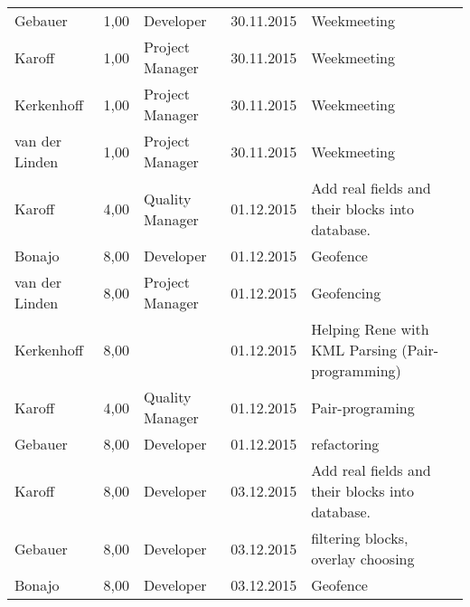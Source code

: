 \begin{longtable}{ l r p{2cm} c p{4cm} }
		Gebauer                 & 1,00           & Developer             & 30.11.2015    & Weekmeeting                                                                     \\
		Karoff                  & 1,00           & Project Manager       & 30.11.2015    & Weekmeeting                                                                     \\
		Kerkenhoff              & 1,00           & Project Manager       & 30.11.2015    & Weekmeeting                                                                     \\
		van der Linden          & 1,00           & Project Manager       & 30.11.2015    & Weekmeeting                                                                     \\
		Karoff                  & 4,00           & Quality Manager       & 01.12.2015    & Add real fields and their blocks into database.                                 \\
		Bonajo                  & 8,00           & Developer             & 01.12.2015    & Geofence                                                                        \\
		van der Linden          & 8,00           & Project Manager       & 01.12.2015    & Geofencing                                                                      \\
		Kerkenhoff              & 8,00           &                       & 01.12.2015    & Helping Rene with KML Parsing (Pair-programming)                                 \\
		Karoff                  & 4,00           & Quality Manager       & 01.12.2015    & Pair-programing                                                                  \\
		Gebauer                 & 8,00           & Developer             & 01.12.2015    & refactoring                                                                     \\
		Karoff                  & 8,00           & Developer             & 03.12.2015    & Add real fields and their blocks into database.                                 \\
		Gebauer                 & 8,00           & Developer             & 03.12.2015    & filtering blocks, overlay choosing                                              \\
		Bonajo                  & 8,00           & Developer             & 03.12.2015    & Geofence                                                                        \\

\end{longtable}
